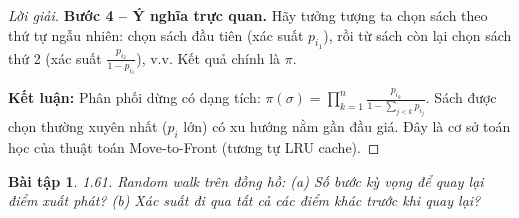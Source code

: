 \documentclass[8pt,a4paper]{article}
\newtheorem{exercise}{Bài tập}
\newenvironment{solution}{\begin{proof}[Lời giải]}{\end{proof}}
\begin{document}
\begin{solution}
\textbf{Bước 4 -- Ý nghĩa trực quan.}
Hãy tưởng tượng ta chọn sách theo thứ tự ngẫu nhiên: chọn sách đầu tiên (xác suất $p_{i_1}$), rồi từ sách còn lại chọn sách thứ 2 (xác suất $\frac{p_{i_2}}{1-p_{i_1}}$), v.v. Kết quả chính là $\pi$.

\textbf{Kết luận:} Phân phối dừng có dạng tích: $\pi(\sigma) = \prod_{k=1}^{n} \frac{p_{i_k}}{1 - \sum_{j<k} p_{i_j}}$. Sách được chọn thường xuyên nhất ($p_i$ lớn) có xu hướng nằm gần đầu giá. Đây là cơ sở toán học của thuật toán Move-to-Front (tương tự LRU cache).
\end{solution}

\begin{exercise}
1.61. Random walk trên đồng hồ: (a) Số bước kỳ vọng để quay lại điểm xuất phát? (b) Xác suất đi qua tất cả các điểm khác trước khi quay lại?
\end{exercise}
\end{document}
